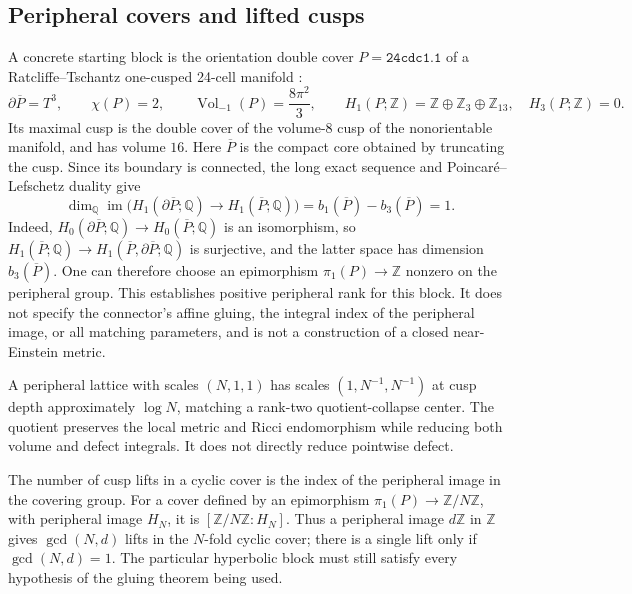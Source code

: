 \documentclass[a4paper,11pt]{article}
\numberwithin{equation}{section}
\theoremstyle{definition}
\newcommand{\Vol}{\operatorname{Vol}}
\newcommand{\Z}{\mathbb Z}
\begin{document}
\subsection{Peripheral covers and lifted cusps}
A concrete starting block is the orientation double cover $P=\texttt{24cdc1.1}$ of a Ratcliffe--Tschantz one-cusped 24-cell manifold \cite[\S\S9,11, Table 2]{RT24}:
\[
 \partial\overline P=T^3,\qquad \chi(P)=2,\qquad
 \Vol_{-1}(P)=\frac{8\pi^2}{3},\qquad
 H_1(P;\Z)=\Z\oplus\Z_3\oplus\Z_{13},\quad H_3(P;\Z)=0.
\]
Its maximal cusp is the double cover of the volume-$8$ cusp of the nonorientable manifold, and has volume $16$.
Here $\overline P$ is the compact core obtained by truncating the cusp.
Since its boundary is connected, the long exact sequence and Poincar\'e--Lefschetz duality give
\begin{equation}\label{eq:peripheral-rank}
 \dim_{\mathbb Q}\operatorname{im}\bigl(H_1(\partial\overline P;\mathbb Q)
        \longrightarrow H_1(\overline P;\mathbb Q)\bigr)
 =b_1(\overline P)-b_3(\overline P)=1.
\end{equation}
Indeed, $H_0(\partial\overline P;\mathbb Q)\to H_0(\overline P;\mathbb Q)$ is an isomorphism, so $H_1(\overline P;\mathbb Q)\to H_1(\overline P,\partial\overline P;\mathbb Q)$ is surjective, and the latter space has dimension $b_3(\overline P)$.
One can therefore choose an epimorphism $\pi_1(P)\to\Z$ nonzero on the peripheral group.
This establishes positive peripheral rank for this block. It does not specify the connector's affine gluing, the integral index of the peripheral image, or all matching parameters, and is not a construction of a closed near-Einstein metric.

A peripheral lattice with scales $(N,1,1)$ has scales $(1,N^{-1},N^{-1})$ at cusp depth approximately $\log N$, matching a rank-two quotient-collapse center.
The quotient preserves the local metric and Ricci endomorphism while reducing both volume and defect integrals. It does not directly reduce pointwise defect.

The number of cusp lifts in a cyclic cover is the index of the peripheral image in the covering group.
For a cover defined by an epimorphism $\pi_1(P)\to\Z/N\Z$, with peripheral image $H_N$, it is $[\Z/N\Z:H_N]$.
Thus a peripheral image $d\Z$ in $\Z$ gives $\gcd(N,d)$ lifts in the $N$-fold cyclic cover; there is a single lift only if $\gcd(N,d)=1$.
The particular hyperbolic block must still satisfy every hypothesis of the gluing theorem being used.
\end{document}
